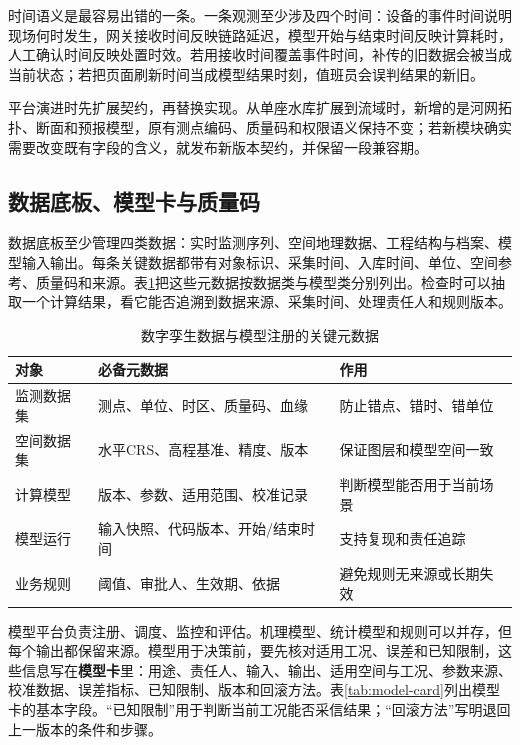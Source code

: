 时间语义是最容易出错的一条。一条观测至少涉及四个时间：设备的事件时间说明现场何时发生，网关接收时间反映链路延迟，模型开始与结束时间反映计算耗时，人工确认时间反映处置时效。若用接收时间覆盖事件时间，补传的旧数据会被当成当前状态；若把页面刷新时间当成模型结果时刻，值班员会误判结果的新旧。

平台演进时先扩展契约，再替换实现。从单座水库扩展到流域时，新增的是河网拓扑、断面和预报模型，原有测点编码、质量码和权限语义保持不变；若新模块确实需要改变既有字段的含义，就发布新版本契约，并保留一段兼容期。

\subsection{数据底板、模型卡与质量码}\label{sec:ch06-twin-data-model}

数据底板至少管理四类数据：实时监测序列、空间地理数据、工程结构与档案、模型输入输出。每条关键数据都带有对象标识、采集时间、入库时间、单位、空间参考、质量码和来源。表\ref{tab:dt-metadata}把这些元数据按数据类与模型类分别列出。检查时可以抽取一个计算结果，看它能否追溯到数据来源、采集时间、处理责任人和规则版本。

\begin{table}[htbp]
\centering
\caption{数字孪生数据与模型注册的关键元数据}
\label{tab:dt-metadata}
\begin{tabular}{p{3cm}p{4.2cm}p{5.6cm}}
\toprule
对象 & 必备元数据 & 作用 \\
\midrule
监测数据集 & 测点、单位、时区、质量码、血缘 & 防止错点、错时、错单位 \\
空间数据集 & 水平CRS、高程基准、精度、版本 & 保证图层和模型空间一致 \\
计算模型 & 版本、参数、适用范围、校准记录 & 判断模型能否用于当前场景 \\
模型运行 & 输入快照、代码版本、开始/结束时间 & 支持复现和责任追踪 \\
业务规则 & 阈值、审批人、生效期、依据 & 避免规则无来源或长期失效 \\
\bottomrule
\end{tabular}
\end{table}

模型平台负责注册、调度、监控和评估。机理模型、统计模型和规则可以并存，但每个输出都保留来源。模型用于决策前，要先核对适用工况、误差和已知限制，这些信息写在\textbf{模型卡}里：用途、责任人、输入、输出、适用空间与工况、参数来源、校准数据、误差指标、已知限制、版本和回滚方法。表\ref{tab:model-card}列出模型卡的基本字段。“已知限制”用于判断当前工况能否采信结果；“回滚方法”写明退回上一版本的条件和步骤。

